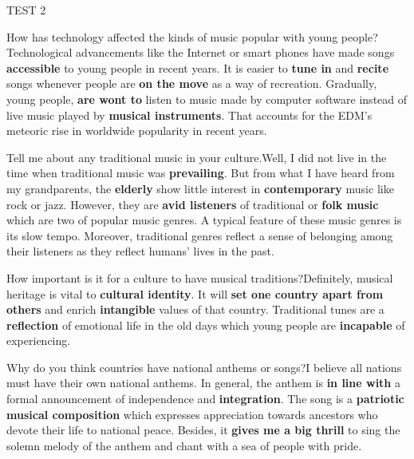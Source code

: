 \begin{glossarymc}[Cambridge 5]
\begin{test}{TEST 2}
    \begin{qa}{How has technology affected the kinds of music popular with young people?}{Technological advancements like the Internet or smart phones have made songs \textbf{accessible} to young people in recent years. It is easier to \textbf{tune in} and \textbf{recite} songs whenever people are \textbf{on the move} as a way of recreation. Gradually, young people, \textbf{are wont to} listen to music made by computer software instead of live music played by \textbf{musical instruments}. That accounts for the EDM's meteoric rise in worldwide popularity in recent years.}
    \end{qa}

    \begin{qa}{Tell me about any traditional music in your culture.}{Well, I did not live in the time when traditional music was \textbf{prevailing}. But from what I have heard from my grandparents, the \textbf{elderly} show little interest in \textbf{contemporary} music like rock or jazz. However, they are \textbf{avid listeners} of traditional or \textbf{folk music} which are two of popular music genres. A typical feature of these music genres is its slow tempo. Moreover, traditional genres reflect a sense of belonging among their listeners as they reflect humans' lives in the past.}
    \end{qa}

    \begin{qa}{How important is it for a culture to have musical traditions?}{Definitely, musical heritage is vital to \textbf{cultural identity}. It will \textbf{set one country apart from others} and enrich \textbf{intangible} values of that country. Traditional tunes are a \textbf{reflection} of emotional life in the old days which young people are \textbf{incapable} of experiencing.}
    \end{qa}

    \begin{qa}{Why do you think countries have national anthems or songs?}{I believe all nations must have their own national anthems. In general, the anthem is \textbf{in line with} a formal announcement of independence and \textbf{integration}. The song is a \textbf{patriotic} \textbf{musical composition} which expresses appreciation towards ancestors who devote their life to national peace. Besides, it \textbf{gives me a big thrill} to sing the solemn melody of the anthem and chant with a sea of people with pride.}
    \end{qa}


\end{test}
\end{glossarymc}

